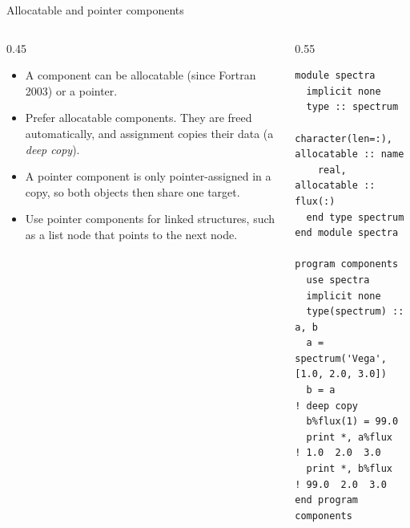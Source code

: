 \begin{frame}[fragile]{Allocatable and pointer components}
  \begin{columns}[T]
    \begin{column}{0.45\textwidth}
      \begin{itemize}
        \item A component can be allocatable (since Fortran 2003) or a pointer.
        \item Prefer allocatable components. They are freed automatically, and assignment copies their data (a \emph{deep copy}).
        \item A pointer component is only pointer-assigned in a copy, so both objects then share one target.
        \item Use pointer components for linked structures, such as a list node that points to the next node.
      \end{itemize}
    \end{column}

    \begin{column}{0.55\textwidth}
      \begin{lstlisting}
module spectra
  implicit none
  type :: spectrum
    character(len=:), allocatable :: name
    real, allocatable :: flux(:)
  end type spectrum
end module spectra

program components
  use spectra
  implicit none
  type(spectrum) :: a, b
  a = spectrum('Vega', [1.0, 2.0, 3.0])
  b = a                  ! deep copy
  b%flux(1) = 99.0
  print *, a%flux        ! 1.0  2.0  3.0
  print *, b%flux        ! 99.0  2.0  3.0
end program components
      \end{lstlisting}
    \end{column}
  \end{columns}
\end{frame}

